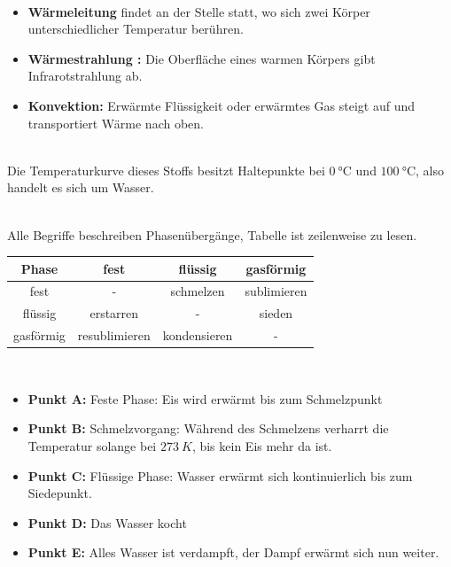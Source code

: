 \documentclass[a4paper]{article}
\begin{document}
\vspace{0.5 cm}

\\
\begin{itemize}
	\item {\bf Wärmeleitung} findet an der Stelle statt, wo sich zwei Körper unterschiedlicher Temperatur berühren.  
	\item {\bf Wärmestrahlung :} Die Oberfläche eines warmen Körpers gibt Infrarotstrahlung ab.
	\item {\bf Konvektion:} Erwärmte Flüssigkeit oder erwärmtes Gas steigt auf und transportiert Wärme nach oben.
\end{itemize}

\\
Die Temperaturkurve dieses Stoffs besitzt Haltepunkte bei $\SI{0}{\celsius}$ und $\SI{100}{\celsius}$, also handelt es sich um Wasser.

\\ 
Alle Begriffe beschreiben Phasenübergänge, Tabelle ist zeilenweise zu lesen. 

\renewcommand{\arraystretch}{2}
\begin{tabular}{|c|c|c|c|}
\hline
Phase & fest & flüssig & gasförmig \\
\hline
fest  &  -  &  schmelzen & sublimieren \\
\hline 
flüssig & erstarren & - & sieden \\
\hline 
gasförmig & resublimieren & kondensieren & - \\
\hline 
\end{tabular} 
\vspace{0.5 cm}

\\
\begin{itemize}
	\item {\bf Punkt A:} Feste Phase: Eis wird erwärmt bis zum Schmelzpunkt 
	\item {\bf Punkt B:} Schmelzvorgang: Während des Schmelzens verharrt die Temperatur solange bei $273~K$, bis kein Eis mehr da ist.
	\item {\bf Punkt C:} Flüssige Phase: Wasser erwärmt sich kontinuierlich bis zum Siedepunkt.
	\item {\bf Punkt D:} Das Wasser kocht
	\item {\bf Punkt E:} Alles Wasser ist verdampft, der Dampf erwärmt sich nun weiter.
\end{itemize} 
\vspace{0.5 cm}
\end{document}
